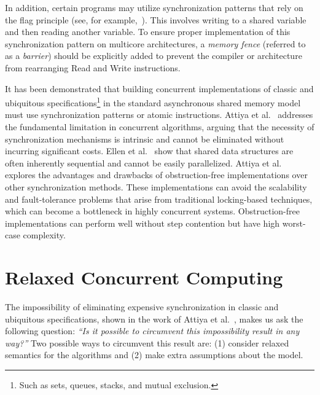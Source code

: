 In addition, certain programs may utilize \RAW synchronization patterns that rely on the flag principle (see, for example,~\cite {DBLP_books_daglib_0020056}). This involves writing to a shared variable and then reading another variable. To ensure proper implementation of this synchronization pattern on multicore architectures, a \textit{memory fence} (referred to as a \textit{barrier}) should be explicitly added to prevent the compiler or architecture from rearranging Read and Write instructions.

It has been demonstrated that building concurrent implementations of classic and ubiquitous specifications\footnote{Such as sets, queues, stacks, and mutual exclusion.} in the standard asynchronous shared memory model must use \RAW synchronization patterns or atomic \RMW instructions. Attiya et al.~\cite{DBLP_conf_popl_AttiyaGHKMV11} addresses the fundamental limitation in concurrent algorithms, arguing that the necessity of synchronization mechanisms is intrinsic and cannot be eliminated without incurring significant costs. Ellen et al.~\cite{DBLP_journals_siamcomp_EllenHS12} show that shared data structures are often inherently sequential and cannot be easily parallelized. Attiya et al.~\cite{DBLP_journals_jacm_AttiyaGHK09} explores the advantages and drawbacks of obstruction-free implementations over other synchronization methods. These implementations can avoid the scalability and fault-tolerance problems that arise from traditional locking-based techniques, which can become a bottleneck in highly concurrent systems. Obstruction-free implementations can perform well without step contention but have high worst-case complexity.

\section{\label{section:relaxed-concurrent}Relaxed Concurrent Computing}

The impossibility of eliminating expensive synchronization in classic and ubiquitous specifications, shown in the work of Attiya et al.~\cite{DBLP_conf_popl_AttiyaGHKMV11}, makes us ask the following question: \textit{``Is it possible to circumvent this impossibility result in any way?''} Two possible ways to circumvent this result are: (1) consider relaxed semantics for the algorithms and (2) make extra assumptions about the model.

